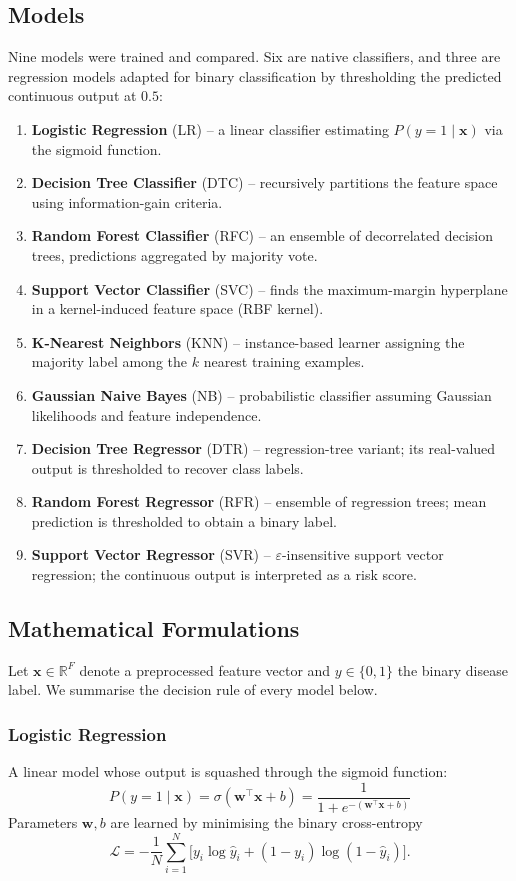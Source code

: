 \documentclass[conference]{IEEEtran}
\begin{document}
\subsection{Models}
Nine models were trained and compared. Six are native classifiers, and three are regression models adapted for binary classification by thresholding the predicted continuous output at $0.5$:
\begin{enumerate}
    \item \textbf{Logistic Regression} (LR) -- a linear classifier estimating $P(y=1\mid \mathbf{x})$ via the sigmoid function.
    \item \textbf{Decision Tree Classifier} (DTC) -- recursively partitions the feature space using information-gain criteria.
    \item \textbf{Random Forest Classifier} (RFC) -- an ensemble of decorrelated decision trees, predictions aggregated by majority vote.
    \item \textbf{Support Vector Classifier} (SVC) -- finds the maximum-margin hyperplane in a kernel-induced feature space (RBF kernel).
    \item \textbf{K-Nearest Neighbors} (KNN) -- instance-based learner assigning the majority label among the $k$ nearest training examples.
    \item \textbf{Gaussian Naive Bayes} (NB) -- probabilistic classifier assuming Gaussian likelihoods and feature independence.
    \item \textbf{Decision Tree Regressor} (DTR) -- regression-tree variant; its real-valued output is thresholded to recover class labels.
    \item \textbf{Random Forest Regressor} (RFR) -- ensemble of regression trees; mean prediction is thresholded to obtain a binary label.
    \item \textbf{Support Vector Regressor} (SVR) -- $\varepsilon$-insensitive support vector regression; the continuous output is interpreted as a risk score.
\end{enumerate}

\subsection{Mathematical Formulations}\label{sec:math}
Let $\mathbf{x} \in \mathbb{R}^{F}$ denote a preprocessed feature vector and $y \in \{0, 1\}$ the binary disease label. We summarise the decision rule of every model below.

\subsubsection{Logistic Regression}
A linear model whose output is squashed through the sigmoid function:
\begin{equation}
P(y = 1 \mid \mathbf{x}) = \sigma(\mathbf{w}^{\top}\mathbf{x} + b) = \frac{1}{1 + e^{-(\mathbf{w}^{\top}\mathbf{x} + b)}}
\end{equation}
Parameters $\mathbf{w}, b$ are learned by minimising the binary cross-entropy
\begin{equation}
\mathcal{L} = -\frac{1}{N}\sum_{i=1}^{N}\bigl[y_i \log \hat{y}_i + (1 - y_i)\log(1 - \hat{y}_i)\bigr].
\end{equation}
\end{document}
